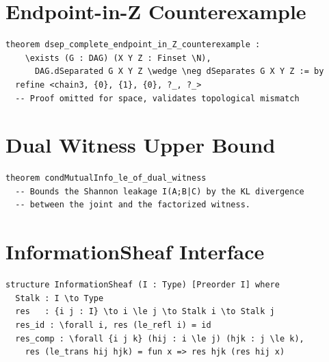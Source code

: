 \documentclass[acmsmall,screen,nonacm]{acmart}
\newcommand{\N}{\mathbb{N}}
\begin{document}
\section{Endpoint-in-Z Counterexample}\label{app:counterexample}
\begin{lstlisting}
theorem dsep_complete_endpoint_in_Z_counterexample :
    \exists (G : DAG) (X Y Z : Finset \N),
      DAG.dSeparated G X Y Z \wedge \neg dSeparates G X Y Z := by
  refine <chain3, {0}, {1}, {0}, ?_, ?_>
  -- Proof omitted for space, validates topological mismatch
\end{lstlisting}

\section{Dual Witness Upper Bound}\label{app:dualwitness}
\begin{lstlisting}
theorem condMutualInfo_le_of_dual_witness
  -- Bounds the Shannon leakage I(A;B|C) by the KL divergence
  -- between the joint and the factorized witness.
\end{lstlisting}

\section{InformationSheaf Interface}\label{app:sheaf}
\begin{lstlisting}
structure InformationSheaf (I : Type) [Preorder I] where
  Stalk : I \to Type
  res   : {i j : I} \to i \le j \to Stalk i \to Stalk j
  res_id : \forall i, res (le_refl i) = id
  res_comp : \forall {i j k} (hij : i \le j) (hjk : j \le k),
    res (le_trans hij hjk) = fun x => res hjk (res hij x)
\end{lstlisting}
\end{document}
